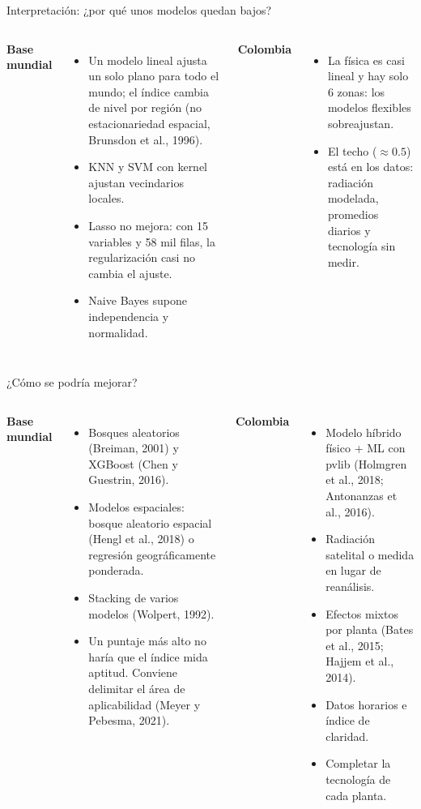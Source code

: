 \documentclass[aspectratio=169,10pt]{beamer}
\begin{document}
\begin{frame}{Interpretación: ¿por qué unos modelos quedan bajos?}
  \begin{columns}[T]
    \textbf{Base mundial}
    \begin{itemize}
      \small
      \item Un modelo lineal ajusta un solo plano para todo el mundo; el índice cambia de nivel por región (no estacionariedad espacial, Brunsdon et al., 1996).
      \item KNN y SVM con kernel ajustan vecindarios locales.
      \item Lasso no mejora: con 15 variables y 58 mil filas, la regularización casi no cambia el ajuste.
      \item Naive Bayes supone independencia y normalidad.
    \end{itemize}
    \textbf{Colombia}
    \begin{itemize}
      \small
      \item La física es casi lineal y hay solo 6 zonas: los modelos flexibles sobreajustan.
      \item El techo ($\approx 0.5$) está en los datos: radiación modelada, promedios diarios y tecnología sin medir.
    \end{itemize}
  \end{columns}
\end{frame}

\begin{frame}{¿Cómo se podría mejorar?}
  \begin{columns}[T]
    \textbf{Base mundial}
    \begin{itemize}
      \small
      \item Bosques aleatorios (Breiman, 2001) y XGBoost (Chen y Guestrin, 2016).
      \item Modelos espaciales: bosque aleatorio espacial (Hengl et al., 2018) o regresión geográficamente ponderada.
      \item Stacking de varios modelos (Wolpert, 1992).
      \item Un puntaje más alto no haría que el índice mida aptitud. Conviene delimitar el área de aplicabilidad (Meyer y Pebesma, 2021).
    \end{itemize}
    \textbf{Colombia}
    \begin{itemize}
      \small
      \item Modelo híbrido físico + ML con pvlib (Holmgren et al., 2018; Antonanzas et al., 2016).
      \item Radiación satelital o medida en lugar de reanálisis.
      \item Efectos mixtos por planta (Bates et al., 2015; Hajjem et al., 2014).
      \item Datos horarios e índice de claridad.
      \item Completar la tecnología de cada planta.
    \end{itemize}
  \end{columns}
\end{frame}
\end{document}
